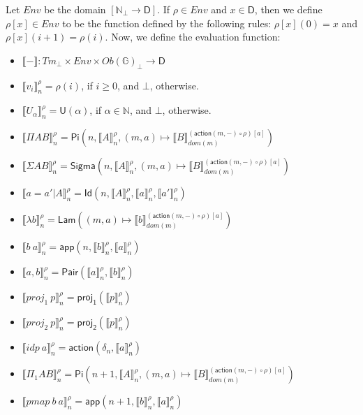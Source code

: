 \documentclass{amsart}
\theoremstyle{definition}
\theoremstyle{remark}
\newcommand{\D}{\mathsf{D}}
\newcommand{\bbG}{\mathbb{G}}
\newcommand{\nats}{\mathbb{N}}
\numberwithin{table}{section}
\begin{document}
Let $Env$ be the domain $[\nats_\bot \to \D]$.
If $\rho \in Env$ and $x \in \D$, then we define $\rho[x] \in Env$ to be the function defined by the following rules: $\rho[x](0) = x$ and $\rho[x](i+1) = \rho(i)$.
Now, we define the evaluation function:
\begin{itemize}
\item[] $\llbracket - \rrbracket : Tm_\bot \times Env \times Ob(\bbG)_\bot \to \D$
\item[] $\llbracket v_i \rrbracket^\rho_n = \rho(i)$, if $i \geq 0$, and $\bot$, otherwise.
\item[] $\llbracket U_\alpha \rrbracket^\rho_n = \mathsf{U}(\alpha)$, if $\alpha \in \nats$, and $\bot$, otherwise.
\item[] $\llbracket \Pi A B \rrbracket^\rho_n = \mathsf{Pi}(n, \llbracket A \rrbracket^\rho_n, (m, a) \mapsto \llbracket B \rrbracket^{(\mathsf{action}(m,-) \circ \rho)[a]}_{dom(m)})$
\item[] $\llbracket \Sigma A B \rrbracket^\rho_n = \mathsf{Sigma}(n, \llbracket A \rrbracket^\rho_n, (m, a) \mapsto \llbracket B \rrbracket^{(\mathsf{action}(m,-) \circ \rho)[a]}_{dom(m)})$
\item[] $\llbracket a = a' | A \rrbracket^\rho_n = \mathsf{Id}(n, \llbracket A \rrbracket^\rho_n, \llbracket a \rrbracket^\rho_n, \llbracket a' \rrbracket^\rho_n)$
\item[] $\llbracket \lambda b \rrbracket^\rho_n = \mathsf{Lam}((m, a) \mapsto \llbracket b \rrbracket^{(\mathsf{action}(m,-) \circ \rho)[a]}_{dom(m)})$
\item[] $\llbracket b\ a \rrbracket^\rho_n = \mathsf{app}(n, \llbracket b \rrbracket^\rho_n, \llbracket a \rrbracket^\rho_n)$
\item[] $\llbracket a, b \rrbracket^\rho_n = \mathsf{Pair}(\llbracket a \rrbracket^\rho_n, \llbracket b \rrbracket^\rho_n)$
\item[] $\llbracket proj_1\ p \rrbracket^\rho_n = \mathsf{proj_1}(\llbracket p \rrbracket^\rho_n)$
\item[] $\llbracket proj_2\ p \rrbracket^\rho_n = \mathsf{proj_2}(\llbracket p \rrbracket^\rho_n)$
\item[] $\llbracket idp\ a \rrbracket^\rho_n = \mathsf{action}(\delta_n, \llbracket a \rrbracket^\rho_n)$
\item[] $\llbracket \Pi_1 A B \rrbracket^\rho_n = \mathsf{Pi}(n + 1, \llbracket A \rrbracket^\rho_n, (m, a) \mapsto \llbracket B \rrbracket^{(\mathsf{action}(m,-) \circ \rho)[a]}_{dom(m)})$
\item[] $\llbracket pmap\ b\ a \rrbracket^\rho_n = \mathsf{app}(n + 1, \llbracket b \rrbracket^\rho_n, \llbracket a \rrbracket^\rho_n)$
\end{itemize}
\end{document}
